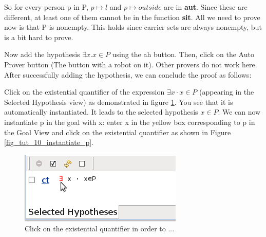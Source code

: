 So for every person \textsf{p} in \textsf{P}, $p \mapsto l$ and $p \mapsto outside$ are in \textbf{aut}. Since these are different, at least one of them cannot be in the function \textbf{sit}. All we need to prove now is that \textsf{P} is nonempty. This holds since carrier sets are always nonempty, but is a bit hard to prove. 



Now add the hypothesis $\exists x . x \in P$ using the \textsf{ah} button. Then, click on the Auto Prover button (The button with a robot on it). Other provers do not work here. After successfully adding the hypothesis, we can conclude the proof as follows:

Click on the existential quantifier of the expression $\exists x \cdot x \in P$ (appearing in the \textsf{Selected Hypothesis} view) as demonstrated in figure \ref{fig_tut_10_instantiate_x}. You see that it is automatically instantiated. It leads to the selected hypothesis $x \in P$. We can now instantiate \textsf{p} in the goal with \textsf{x}: enter \textsf{x} in the yellow box corresponding to \textsf{p} in the \textsf{Goal View} and click on the existential quantifier as shown in Figure \ref{fig_tut_10_instantiate_p}. 

\begin{figure}[!h]
\begin{center}
	\includegraphics{img/tutorial/tut_10_instantiate_x.png}
	\caption{Click on the existential quantifier in order to ...}
	\label{fig_tut_10_instantiate_x}
\end{center}
\end{figure}

